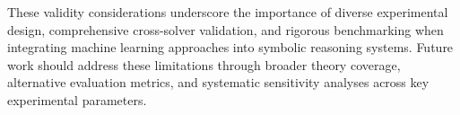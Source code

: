 These validity considerations underscore the importance of diverse experimental design, comprehensive cross-solver validation, and rigorous benchmarking when integrating machine learning approaches into symbolic reasoning systems. Future work should address these limitations through broader theory coverage, alternative evaluation metrics, and systematic sensitivity analyses across key experimental parameters.



